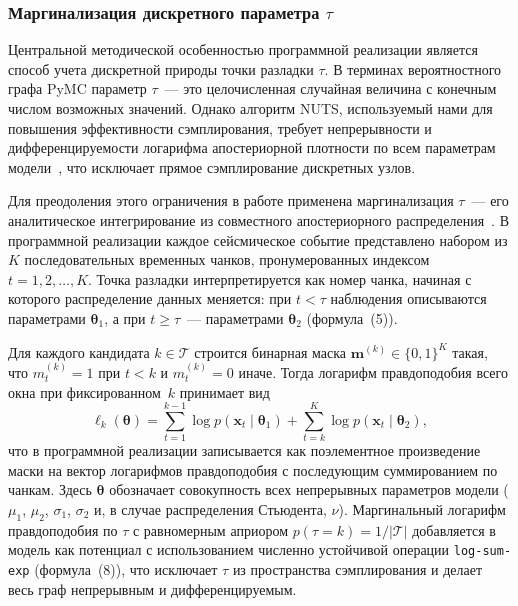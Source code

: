 \documentclass[14pt]{mmcs_article}
\begin{document}
\subsubsection*{Маргинализация дискретного параметра $\tau$}\label{marginalization}

Центральной методической особенностью программной реализации
является способ учета дискретной природы точки разладки
$\tau$. В терминах вероятностного графа PyMC параметр
$\tau$~--- это целочисленная случайная величина с конечным
числом возможных значений. Однако алгоритм NUTS, используемый
нами для повышения эффективности сэмплирования, требует
непрерывности и дифференцируемости логарифма апостериорной
плотности по всем параметрам модели~\cite{HoffmanGelman2014},
что исключает прямое сэмплирование дискретных узлов.

Для преодоления этого ограничения в работе применена
маргинализация $\tau$~--- его аналитическое интегрирование
из совместного апостериорного распределения~\cite{%
	lai2023automaticallymarginalizedmcmcprobabilistic}.
В программной реализации каждое сейсмическое событие
представлено набором из $K$ последовательных временных
чанков, пронумерованных индексом $t = 1, 2, \dots, K$.
Точка разладки интерпретируется как номер чанка, начиная с
которого распределение данных меняется: при $t < \tau$
наблюдения описываются параметрами $\boldsymbol{\theta}_1$,
а при $t \geq \tau$~--- параметрами $\boldsymbol{\theta}_2$
(формула~(5)).

Для каждого кандидата $k \in \mathcal{T}$ строится бинарная
маска\linebreak
$\mathbf{m}^{(k)} \in \{0, 1\}^K$ такая, что
$m^{(k)}_t = 1$ при $t < k$ и $m^{(k)}_t = 0$ иначе. Тогда
логарифм правдоподобия всего окна при фиксированном~$k$
принимает вид
\begin{equation}
	\ell_k(\boldsymbol{\theta}) =
	\sum_{t=1}^{k-1} \log p(\mathbf{x}_t \mid \boldsymbol{\theta}_1)
	+ \sum_{t=k}^{K} \log p(\mathbf{x}_t \mid \boldsymbol{\theta}_2),
\end{equation}
что в программной реализации записывается как поэлементное
произведение маски на вектор логарифмов правдоподобия с
последующим суммированием по чанкам. Здесь $\boldsymbol{\theta}$
обозначает совокупность всех непрерывных параметров модели
($\mu_1$, $\mu_2$, $\sigma_1$, $\sigma_2$ и, в случае
распределения Стьюдента, $\nu$).
Маргинальный логарифм правдоподобия по $\tau$ с равномерным
априором $p(\tau=k)=1/|\mathcal{T}|$ добавляется в модель как
потенциал с использованием численно устойчивой операции
\texttt{log-sum-exp} (формула~(8)), что исключает $\tau$ из
пространства сэмплирования и делает весь граф непрерывным и
дифференцируемым.
\end{document}
